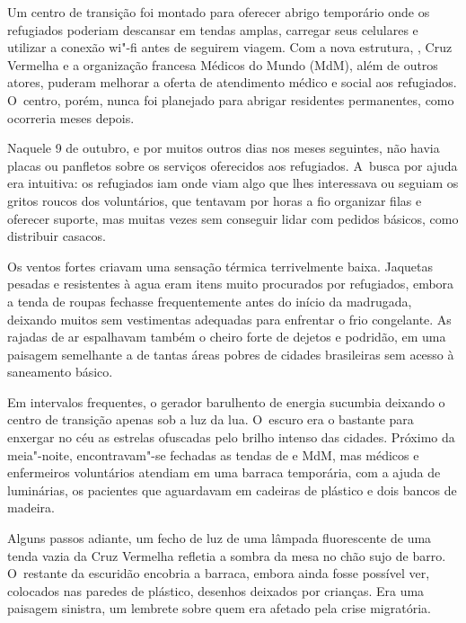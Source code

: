 Um centro de transição foi montado para oferecer abrigo temporário onde
os refugiados poderiam descansar em tendas amplas, carregar
seus celulares e utilizar a conexão wi"-fi antes de seguirem viagem. Com
a nova estrutura, , Cruz Vermelha e a organização francesa Médicos do
Mundo (MdM), além de outros atores, puderam melhorar a oferta de
atendimento médico e social aos refugiados. O~centro, porém, nunca foi
planejado para abrigar residentes permanentes, como ocorreria meses
depois.

Naquele 9 de outubro, e por muitos outros dias nos meses seguintes, não
havia placas ou panfletos sobre os serviços oferecidos aos refugiados. A~busca por ajuda era intuitiva: os refugiados iam onde viam algo que lhes
interessava ou seguiam os gritos roucos dos voluntários, que tentavam
por horas a fio organizar filas e oferecer suporte, mas muitas vezes sem
conseguir lidar com pedidos básicos, como distribuir casacos.

Os ventos fortes criavam uma sensação térmica terrivelmente baixa.
Jaquetas pesadas e resistentes à agua eram itens muito procurados por
refugiados, embora a tenda de roupas fechasse frequentemente antes do
início da madrugada, deixando muitos sem vestimentas adequadas para
enfrentar o frio congelante. As rajadas de ar espalhavam também o cheiro
forte de dejetos e podridão, em uma paisagem semelhante a de tantas
áreas pobres de cidades brasileiras sem acesso à saneamento básico.

Em intervalos frequentes, o gerador barulhento de energia sucumbia
deixando o centro de transição apenas sob a luz da lua. O~escuro era o
bastante para enxergar no céu as estrelas ofuscadas pelo brilho intenso
das cidades. Próximo da meia"-noite, encontravam"-se fechadas as tendas de
 e MdM, mas médicos e enfermeiros voluntários atendiam em uma barraca
temporária, com a ajuda de  luminárias, os pacientes que
aguardavam em cadeiras de plástico e dois bancos de madeira.

Alguns passos adiante, um fecho de luz de uma lâmpada fluorescente de uma tenda vazia da Cruz Vermelha refletia a sombra da mesa no chão sujo de barro. O~restante da escuridão encobria a barraca, embora ainda
fosse possível ver, colocados nas paredes de plástico, desenhos deixados
por crianças. Era uma paisagem sinistra, um lembrete sobre
quem era afetado pela crise migratória.


